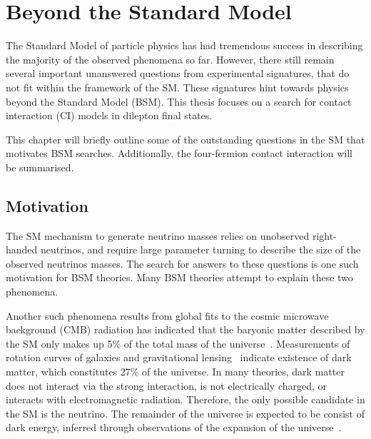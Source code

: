\chapter{Beyond the Standard Model}\label{chap:bsm}

The Standard Model of particle physics has had tremendous success in describing the majority of the observed phenomena so far. However, there still remain several important unanswered questions from experimental signatures, that do not fit within the framework of the SM. These signatures hint towards physics beyond the Standard Model (BSM). This thesis focuses on a search for contact interaction (CI) models in dilepton final states. 

This chapter will briefly outline some of the outstanding questions in the SM that motivates BSM searches. Additionally, the four-fermion contact interaction will be summarised. 

\section{Motivation}
The SM mechanism to generate neutrino masses relies on unobserved right-handed neutrinos, and require large parameter turning to describe the size of the observed neutrinos masses. The search for answers to these questions is one such motivation for BSM theories. Many BSM theories attempt to explain these two phenomena. 

Another such phenomena results from global fits to the cosmic microwave background (CMB) radiation has indicated that the baryonic matter described by the SM only makes up 5\% of the total mass of the universe~\cite{Bennett_2013,2014Plank}. Measurements of rotation curves of galaxies and gravitational lensing~\cite{roos2010dark} indicate existence of dark matter, which constitutes 27\% of the universe. In many theories, dark matter does not interact via the strong interaction, is not electrically charged, or interacts with electromagnetic radiation. Therefore, the only possible candidate in the SM is the neutrino. The remainder of the universe is expected to be consist of dark energy, inferred through observations of the expansion of the universe~\cite{Peebles_2003}. 

